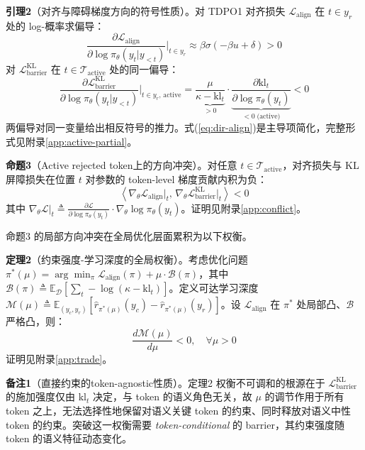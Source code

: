 \documentclass[lettersize,journal]{IEEEtran}
\begin{document}
\textbf{引理2}（对齐与障碍梯度方向的符号性质）。对 TDPO1 对齐损失 $\mathcal{L}_{\text{align}}$ 在 $t \in y_r$ 处的 log-概率求偏导：
\begin{equation}\label{eq:dir-align}
\frac{\partial \mathcal{L}_{\text{align}}}{\partial \log\pi_\theta(y_t|y_{<t})}\bigg|_{t \in y_r} \approx \beta \sigma\!\left(-\beta u + \delta\right) > 0
\end{equation}
对 $\mathcal{L}^{\text{KL}}_{\text{barrier}}$ 在 $t \in \mathcal{T}_{\text{active}}$ 处的同一偏导：
\begin{equation}\label{eq:dir-barrier}
\frac{\partial \mathcal{L}^{\text{KL}}_{\text{barrier}}}{\partial \log\pi_\theta(y_t|y_{<t})}\bigg|_{t \in y_r,\,\text{active}} = \underbrace{\frac{\mu}{\kappa - \text{kl}_t}}_{> 0} \cdot \underbrace{\frac{\partial \text{kl}_t}{\partial \log\pi_\theta(y_t)}}_{< 0\;\text{(active)}} < 0
\end{equation}
两偏导对同一变量给出相反符号的推力。式(\ref{eq:dir-align})是主导项简化，完整形式见附录\ref{app:active-partial}。

\textbf{命题3}（Active rejected token上的方向冲突）。对任意 $t \in \mathcal{T}_{\text{active}}$，对齐损失与 KL 屏障损失在位置 $t$ 对参数的 token-level 梯度贡献内积为负：
\begin{equation}\label{eq:per-token-conflict}
\left\langle \nabla_\theta \mathcal{L}_{\text{align}}\big|_t,\, \nabla_\theta \mathcal{L}^{\text{KL}}_{\text{barrier}}\big|_t \right\rangle < 0
\end{equation}
其中 $\nabla_\theta \mathcal{L}|_t \triangleq \frac{\partial \mathcal{L}}{\partial \log\pi_\theta(y_t)} \cdot \nabla_\theta \log\pi_\theta(y_t)$。证明见附录\ref{app:conflict}。

命题3 的局部方向冲突在全局优化层面累积为以下权衡。

\textbf{定理2}（约束强度-学习深度的全局权衡）。考虑优化问题 $\pi^*(\mu) = \arg\min_\pi \mathcal{L}_{\text{align}}(\pi) + \mu \cdot \mathcal{B}(\pi)$，其中 $\mathcal{B}(\pi) \triangleq \mathbb{E}_{\mathcal{D}}[\sum_t -\log(\kappa - \text{kl}_t)]$。定义可达学习深度 $\mathcal{M}(\mu) \triangleq \mathbb{E}_{(y_c, y_r)}[\hat{r}_{\pi^*(\mu)}(y_c) - \hat{r}_{\pi^*(\mu)}(y_r)]$。设 $\mathcal{L}_{\text{align}}$ 在 $\pi^*$ 处局部凸、$\mathcal{B}$ 严格凸，则：
\begin{equation}\label{eq:trade-result}
\frac{d\mathcal{M}(\mu)}{d\mu} < 0, \quad \forall \mu > 0
\end{equation}
证明见附录\ref{app:trade}。

\textbf{备注1}（直接约束的token-agnostic性质）。定理2 权衡不可调和的根源在于 $\mathcal{L}^{\text{KL}}_{\text{barrier}}$ 的施加强度仅由 $\text{kl}_t$ 决定，与 token 的语义角色无关，故 $\mu$ 的调节作用于所有 token 之上，无法选择性地保留对语义关键 token 的约束、同时释放对语义中性 token 的约束。突破这一权衡需要 \textit{token-conditional} 的 barrier，其约束强度随 token 的语义特征动态变化。
\end{document}
